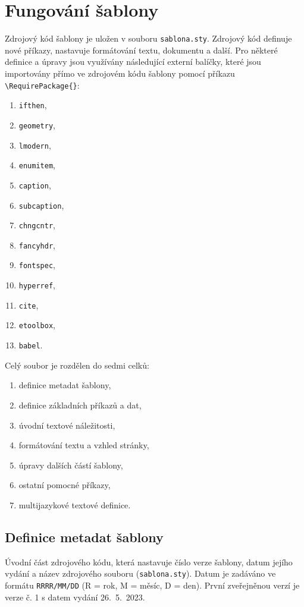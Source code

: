 \section{Fungování šablony}
Zdrojový kód šablony je uložen v souboru \verb|sablona.sty|. Zdrojový kód definuje nové příkazy, nastavuje formátování textu, dokumentu a další. Pro některé definice a úpravy jsou využívány následující externí balíčky, které jsou importovány přímo ve zdrojovém kódu šablony pomocí příkazu \verb|\RequirePackage{}|:

\begin{multicols}{2}
	\begin{enumerate}
		\item \verb|ifthen|,
		\item \verb|geometry|,
		\item \verb|lmodern|,
		\item \verb|enumitem|,
		\item \verb|caption|,
		\item \verb|subcaption|,
		\item \verb|chngcntr|,
	\columnbreak
		\item \verb|fancyhdr|,
		\item \verb|fontspec|,
		\item \verb|hyperref|,
		\item \verb|cite|,
		\item \verb|etoolbox|,
		\item \verb|babel|.
	\end{enumerate}
\end{multicols}

Celý soubor je rozdělen do sedmi celků:

\begin{enumerate}
	\item definice metadat šablony,
	\item definice základních příkazů a dat,
	\item úvodní textové náležitosti,
	\item formátování textu a vzhled stránky,
	\item úpravy dalších částí šablony,
	\item ostatní pomocné příkazy,
	\item multijazykové textové definice.
\end{enumerate}



\subsection{Definice metadat šablony}
Úvodní část zdrojového kódu, která nastavuje číslo verze šablony, datum jejího vydání a název zdrojového souboru (\verb|sablona.sty|). Datum je zadáváno ve formátu \verb|RRRR/MM/DD| (R = rok, M = měsíc, D = den). První zveřejněnou verzí je verze č. 1 s datem vydání 26.~5.~2023. 

